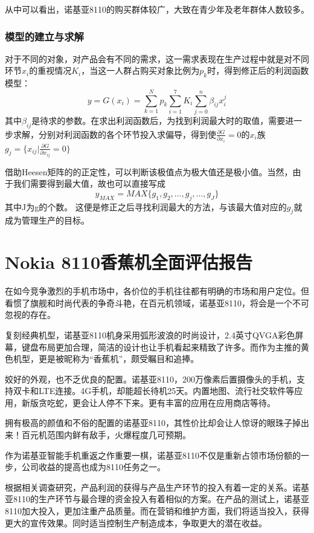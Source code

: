 \documentclass[12pt]{article}%
\begin{document}
从中可以看出，诺基亚8110的购买群体较广，大致在青少年及老年群体人数较多。
\subsubsection{模型的建立与求解}
对于不同的对象，对产品会有不同的需求，这一需求表现在生产过程中就是对不同环节$x_i$的重视情况$K_i$，当这一人群占购买对象比例为$p_k$时，得到修正后的利润函数模型：
\begin{equation}
y=G(x_i)=\sum_{k=1}^Np_k\sum_{i=1}^7K_{i}\sum_{j=0}^n\beta_{ij}x_i^j
\end{equation}
其中$\beta_{ij}$是待求的参数。在求出利润函数后，为找到利润最大时的取值，需要进一步求解，分别对利润函数的各个环节投入求偏导，得到使$\frac{\partial G}{\partial x_i}=0$的$x_i$族$g_{j}=\{x_{ij}|\frac{\partial G}{\partial x_{ij}}=0\}$

借助Heesen矩阵的的正定性，可以判断该极值点为极大值还是极小值。当然，由于我们需要得到最大值，故也可以直接写成
\begin{equation}
y_{MAX}=MAX\{g_1,g_2,\dots,g_j,\dots,g_J\}
\end{equation}
其中J为g的个数。
这便是修正之后寻找利润最大的方法，与该最大值对应的$g_j$就成为管理生产的目标。
\newpage
\section{Nokia 8110香蕉机全面评估报告}
在如今竞争激烈的手机市场中，各价位的手机往往都有明确的市场和用户定位。但看惯了旗舰和时尚代表的争奇斗艳，在百元机领域，诺基亚8110，将会是一个不可忽视的存在。

复刻经典机型，诺基亚8110机身采用弧形波浪的时尚设计，2.4英寸QVGA彩色屏幕，键盘布局更加合理，简洁的设计也让手机看起来精致了许多。而作为主推的黄色机型，更是被昵称为“香蕉机”，颇受瞩目和追捧。

姣好的外观，也不乏优良的配置。诺基亚8110，200万像素后置摄像头的手机，支持双卡和LTE连接。4G手机，却能超长待机25天。内置地图、流行社交软件等应用，新版贪吃蛇，更会让人停不下来。更有丰富的应用在应用商店等待。

拥有极高的颜值和不俗的配置的诺基亚8110，其性价比却会让人惊讶的眼珠子掉出来！百元机范围内鲜有敌手，火爆程度几可预期。

作为诺基亚智能手机重返之作重要一棋，诺基亚8110不仅是重新占领市场份额的一步，公司收益的提高也成为8110任务之一。

根据相关调查研究，产品利润的获得与产品生产环节的投入有着一定的关系。诺基亚8110的生产环节与最合理的资金投入有着相似的方案。在产品的测试上，诺基亚8110加大投入，更加注重产品质量。而在营销和维护方面，我们将适当投入，获得更大的宣传效果。同时适当控制生产制造成本，争取更大的潜在收益。
\end{document}
